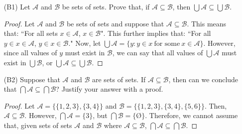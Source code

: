 \documentclass{article}
\begin{document}
    \begin{itemize}
    
        \item [(B1)] Let $\mathcal{A}$ and $\mathcal{B}$ be sets of sets.  Prove that, if $\mathcal{A} \subseteq \mathcal{B}$, then $\bigcup \mathcal{A} \subseteq \bigcup \mathcal{B}$.
            \begin{proof}
                Let $\mathcal{A}$ and $\mathcal{B}$ be sets of sets and suppose that $\mathcal{A} \subseteq \mathcal{B}$. This means that: ``For all sets $x \in \mathcal{A}$, $x \in \mathcal{B}$". This further implies that: ``For all $y \in x \in \mathcal{A}$, $y \in x \in \mathcal{B}$." Now, let $\bigcup \mathcal{A} = \{ y: y \in x \ \text{for some} \ x \in \mathcal{A} \}$. However, since all values of $y$ must exist in $\mathcal{B}$, we can say that all values of $\bigcup \mathcal{A}$ must exist in $\bigcup \mathcal{B}$, or $\bigcup \mathcal{A} \subseteq \bigcup \mathcal{B}$. 
            \end{proof}

        \item [(B2)] Suppose that $\mathcal{A}$ and $\mathcal{B}$ are sets of sets.  If $\mathcal{A} \subseteq \mathcal{B}$, then can we conclude that $\bigcap \mathcal{A} \subseteq \bigcap \mathcal{B}$? Justify your answer with a proof.
            \begin{proof}
                Let $\mathcal{A} = \{ \{1, 2, 3 \}, \{ 3, 4 \} \}$ and $\mathcal{B} = \{ \{1, 2, 3 \}, \{ 3, 4 \}, \{ 5, 6 \}\}$. Then, $\mathcal{A} \subseteq \mathcal{B}$. However, $\bigcap \mathcal{A} = \{ 3 \}$, but $\bigcap \mathcal{B} = \{ \text{\O} \}$. Therefore, we cannot assume that, given sets of sets $\mathcal{A}$ and $\mathcal{B}$ where $\mathcal{A} \subseteq \mathcal{B}$, $\bigcap \mathcal{A} \subseteq \bigcap \mathcal{B}$.
            \end{proof}
    \end{itemize}
\end{document}
